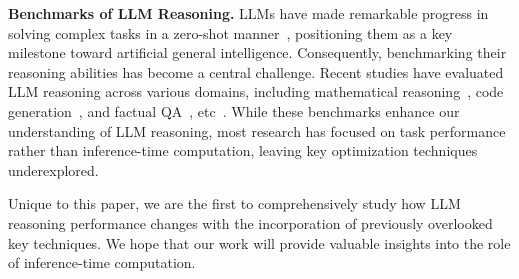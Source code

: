 \textbf{Benchmarks of LLM Reasoning.}  LLMs have made remarkable progress in solving complex tasks in a zero-shot manner~\cite{hendrycks2021measuringMATH, press2022measuring_bamboogle, liu2024jailjudgecomprehensivejailbreakjudge}, positioning them as a key milestone toward artificial general intelligence. Consequently, benchmarking their reasoning abilities has become a central challenge. Recent studies have evaluated LLM reasoning across various domains, including mathematical reasoning~\cite{hendrycks2021measuringMATH}, code generation~\cite{chen2021codex_humaneval}, and factual QA~\cite{Thorne18Fever}, etc~\cite{liu2024regmix, liu2024adversarial}. While these benchmarks enhance our understanding of LLM reasoning, most research has focused on task performance rather than inference-time computation, leaving key optimization techniques underexplored.




Unique to this paper, we are the first to comprehensively study how LLM reasoning performance changes with the incorporation of previously overlooked key techniques. We hope that our work will provide valuable insights into the role of inference-time computation.


\vspace{-0.2in}